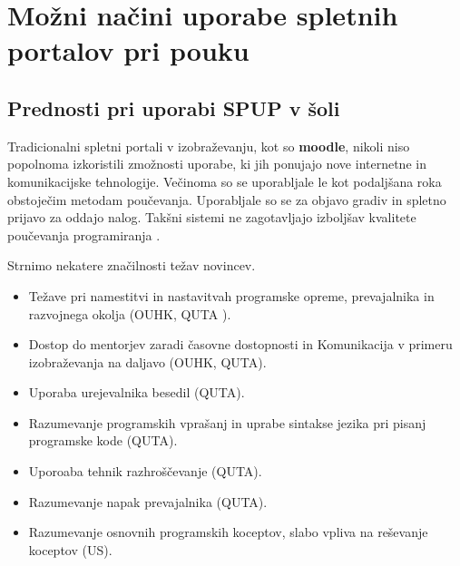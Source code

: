 \section{Možni načini uporabe spletnih portalov pri pouku}
\label{sec:načini_uporabe_sp}

\subsection{Prednosti pri uporabi SPUP v šoli }
\label{sec:Prednosti_pri_uporavi_SPUP}




Tradicionalni spletni portali v izobraževanju, kot so \textbf{moodle},
nikoli niso popolnoma izkoristili zmožnosti uporabe, ki jih ponujajo
nove internetne in komunikacijske tehnologije. Večinoma so se
uporabljale le kot podaljšana roka obstoječim metodam
poučevanja. Uporabljale so se za objavo gradiv in spletno prijavo za
oddajo nalog. Takšni sistemi ne zagotavljajo izboljšav kvalitete
poučevanja programiranja \cite{ITaLCP_DistanceEdu}.

Strnimo nekatere značilnosti težav novincev.

\begin{itemize}
\tightlist
\item Težave pri namestitvi in nastavitvah programske opreme,
  prevajalnika in razvojnega okolja (OUHK, QUTA ).
\item Dostop do mentorjev zaradi časovne dostopnosti in Komunikacija v
  primeru izobraževanja na daljavo (OUHK, QUTA).
\item Uporaba urejevalnika besedil (QUTA).
\item Razumevanje programskih vprašanj in uprabe sintakse jezika pri
  pisanj programske kode (QUTA).
\item Uporoaba tehnik razhroščevanje (QUTA).
\item Razumevanje napak prevajalnika (QUTA).
\item Razumevanje osnovnih programskih koceptov, slabo vpliva na
  reševanje koceptov (US).
\end{itemize}

